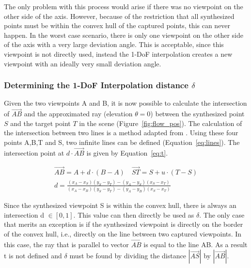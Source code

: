 The only problem with this process would arise if there was no viewpoint on the other side of the axis. However, because of the restriction that all synthesized points must be within the convex hull of the captured points, this can never happen. In the worst case scenario, there is only one viewpoint on the other side of the axis with a very large deviation angle. This is acceptable, since this viewpoint is not directly used, instead the 1-DoF interpolation creates a new viewpoint with an ideally very small deviation angle.

\subsubsection{Determining the 1-DoF Interpolation distance $\delta$}
Given the two viewpoints A and B, it is now possible to calculate the intersection of $\overrightarrow{AB}$ and the approximated ray (elevation $\theta = 0$) between the synthesized point $S$ and the target point $T$ in the scene (Figure~\ref{fig:flow_pos}). The calculation of the intersection between two lines is a method adapted from \cite{lineline}. Using these four points A,B,T and S, two infinite lines can be defined (Equation~\ref{eq:lines}). The intersection point at $d \cdot \overrightarrow{AB}$ is given by Equation~\ref{eq:t}.

\begin{align}
  \overrightarrow{AB} = A + d \cdot (B-A) \quad \overrightarrow{ST} = S + u \cdot (T-S) \label{eq:lines} \\
  d = \frac{(x_A - x_S)(y_S - y_T) - (y_A - y_S)(x_S - x_T)}{(x_A - x_B)(y_S - y_T) - (y_A - y_B)(x_S - x_T)} \label{eq:t}
\end{align}

Since the synthesized viewpoint S is within the convex hull, there is always an intersection d $\in [0,1]$. This value can then directly be used as $\delta$. The only case that merits an exception is if the synthesized viewpoint is directly on the border of the convex hull, i.e., directly on the line between two captured viewpoints. In this case, the ray that is parallel to vector $\overrightarrow{AB}$ is equal to the line AB. As a result t is not defined and $\delta$ must be found by dividing the distance $|\overrightarrow{AS}|$ by $|\overrightarrow{AB}|$.

